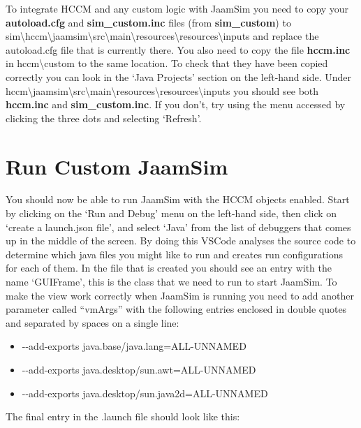 \documentclass[
  10pt,
  a4paperpaper,
  DIV=11,
  numbers=noendperiod,
  oneside]{scrreprt}
\providecommand{\tightlist}{%
  \setlength{\itemsep}{0pt}\setlength{\parskip}{0pt}}\usepackage{longtable,booktabs,array}
\begin{document}
To integrate HCCM and any custom logic with JaamSim you need to copy
your \textbf{autoload.cfg} and \textbf{sim\_custom.inc} files (from
\textbf{sim\_custom}) to
sim\textbackslash hccm\textbackslash jaamsim\textbackslash src\textbackslash main\textbackslash resources\textbackslash resources\textbackslash inputs
and replace the autoload.cfg file that is currently there. You also need
to copy the file \textbf{hccm.inc} in hccm\textbackslash custom to the
same location. To check that they have been copied correctly you can
look in the `Java Projects' section on the left-hand side. Under
hccm\textbackslash jaamsim\textbackslash src\textbackslash main\textbackslash resources\textbackslash resources\textbackslash inputs
you should see both \textbf{hccm.inc} and \textbf{sim\_custom.inc}. If
you don't, try using the menu accessed by clicking the three dots and
selecting `Refresh'.

\section{Run Custom JaamSim}\label{run-custom-jaamsim}

You should now be able to run JaamSim with the HCCM objects enabled.
Start by clicking on the `Run and Debug' menu on the left-hand side,
then click on `create a launch.json file', and select `Java' from the
list of debuggers that comes up in the middle of the screen. By doing
this VSCode analyses the source code to determine which java files you
might like to run and creates run configurations for each of them. In
the file that is created you should see an entry with the name
`GUIFrame', this is the class that we need to run to start JaamSim. To
make the view work correctly when JaamSim is running you need to add
another parameter called ``vmArgs'' with the following entries enclosed
in double quotes and separated by spaces on a single line:

\begin{itemize}
\tightlist
\item
  -\/-add-exports java.base/java.lang=ALL-UNNAMED
\item
  -\/-add-exports java.desktop/sun.awt=ALL-UNNAMED
\item
  -\/-add-exports java.desktop/sun.java2d=ALL-UNNAMED
\end{itemize}

The final entry in the .launch file should look like this:
\end{document}
